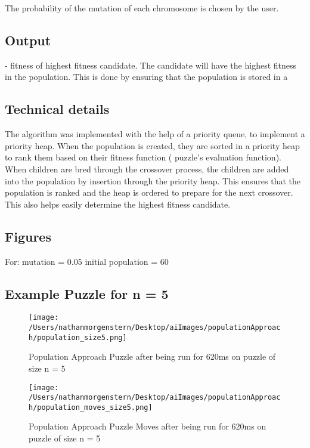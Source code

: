 \documentclass{report}
\begin{document}
The probability of the mutation of each chromosome is chosen by the user.	


\subsection{Output}
	- fitness of highest fitness candidate.
The candidate will have the highest fitness in the population. This is done by ensuring that the population is stored in a 


\subsection{Technical details}
The algorithm was implemented with the help of a priority queue, to implement a priority heap. When the population is created, they are sorted in a priority heap to rank them based on their fitness function ( puzzle's evaluation function). When children are bred through the crossover process, the children are added into the population by insertion through the priority heap. This ensures that the population is ranked and the heap is ordered to prepare for the next crossover. This also helps easily determine the highest fitness candidate.

\subsection{Figures}
For: mutation = 0.05 initial population = 60


\subsection{Example Puzzle for n = 5}

	\begin{figure}[H]
	\centering
	\texttt{[image: /Users/nathanmorgenstern/Desktop/aiImages/populationApproach/population\_size5.png]}
	\caption{Population Approach Puzzle after being run for 620ms on puzzle of size n = 5}
	\label{fig: Population Approach Puzzle after being run for 620ms on puzzle of size n = 5}
	\end{figure}
	
	\begin{figure}[H]
	\centering
	\texttt{[image: /Users/nathanmorgenstern/Desktop/aiImages/populationApproach/population\_moves\_size5.png]}
	\caption{Population Approach Puzzle Moves after being run for 620ms on puzzle of size n = 5}
	\label{fig: Population Approach Puzzle Moves after being run for 620ms on puzzle of size n = 5}
	\end{figure}
	
\end{document}

